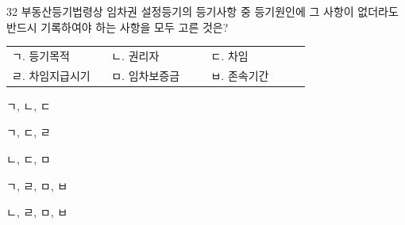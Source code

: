 \begin{question}{32}
부동산등기법령상 임차권 설정등기의 등기사항 중 등기원인에 그 사항이 없더라도 반드시 기록하여야 하는 사항을 모두 고른 것은?
\begin{framedtext}
\begin{tabular}{@{}p{0.3\linewidth}p{0.3\linewidth}p{0.3\linewidth}@{}}
ㄱ. 등기목적 & ㄴ. 권리자 & ㄷ. 차임 \\
ㄹ. 차임지급시기 & ㅁ. 임차보증금 & ㅂ. 존속기간
\end{tabular}
\end{framedtext}
\begin{choices}
  \item ㄱ, ㄴ, ㄷ
  \item ㄱ, ㄷ, ㄹ
  \item ㄴ, ㄷ, ㅁ
  \item ㄱ, ㄹ, ㅁ, ㅂ
  \item ㄴ, ㄹ, ㅁ, ㅂ
\end{choices}
\end{question}
